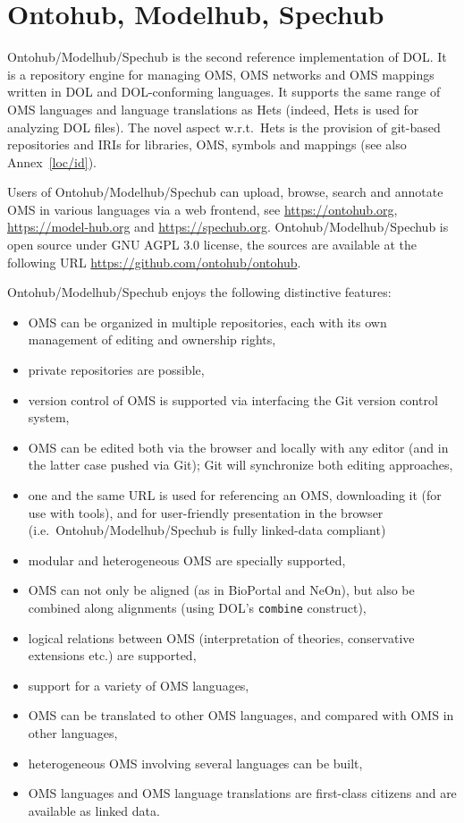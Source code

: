 \documentclass[10pt,fleqn,%
\ifpretendfinal
final%
\else
draft%
\fi,
]{scrreprt}
\newcommand*{\syntax}[1]{\texttt{#1}}
\newcommand{\sclause}[1]{\section{#1}}
\begin{document}
\sclause{Ontohub, Modelhub, Spechub}\label{a:ontohub}

Ontohub/Modelhub/Spechub is the second reference implementation of
DOL. It is a repository engine for managing OMS, OMS networks and OMS
mappings written in DOL and DOL-conforming languages.  It supports the
same range of OMS languages and language translations as Hets (indeed,
Hets is used for analyzing DOL files). The novel aspect w.r.t.\ Hets
is the provision of git-based repositories and IRIs for libraries,
OMS, symbols and mappings (see also Annex~\ref{loc/id}).

Users of Ontohub/Modelhub/Spechub can upload, browse, search and annotate 
OMS in various languages via a web frontend, 
see \url{https://ontohub.org}, \url{https://model-hub.org} and \url{https://spechub.org}.
Ontohub/Modelhub/Spechub is open source under GNU AGPL 3.0 license,  the sources are available at the following URL 
\url{https://github.com/ontohub/ontohub}.

Ontohub/Modelhub/Spechub enjoys the following distinctive features:
\begin{itemize}
  \item OMS can be organized in multiple repositories, each
     with its own management of editing and ownership rights,
  \item private repositories are possible,
  \item version control of OMS is supported via interfacing
   the Git version control system,
  \item OMS can be edited both via the browser and locally with any
  editor (and in the latter case pushed via Git); Git will synchronize both editing approaches,
  \item one and the same URL is used for referencing an OMS, downloading
     it (for use with tools), and for user-friendly presentation in
     the browser (i.e.\ Ontohub/Modelhub/Spechub is fully linked-data compliant)
  \item modular and heterogeneous OMS are specially supported,
  \item OMS can not only be aligned (as in BioPortal and NeOn), but also be combined along alignments (using DOL's \syntax{combine} construct),
  \item logical relations between OMS (interpretation of theories, conservative
  extensions etc.) are supported,
  \item support for a variety of OMS languages, 
  \item OMS can be translated to other OMS languages, and compared with
   OMS in other languages,
  \item heterogeneous OMS involving several languages can be built,
  \item OMS languages and OMS language translations are first-class
   citizens and are available as linked data.
\end{itemize}
\end{document}
